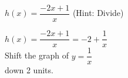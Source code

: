 {$h(x) = \dfrac{-2x + 1}{x}$ (Hint: Divide)}
{$h(x) = \dfrac{-2x + 1}{x} = -2 + \dfrac{1}{x}$\\
Shift the graph of $y = \dfrac{1}{x}$\\
down 2 units.


\begin{center}
\end{center}}